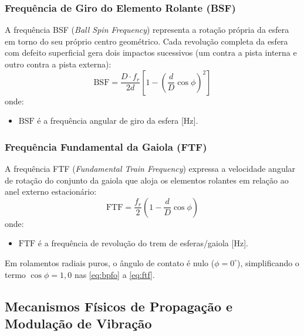 \subsubsection{Frequência de Giro do Elemento Rolante (BSF)}
A frequência BSF (\textit{Ball Spin Frequency}) representa a rotação própria da esfera em torno do seu próprio centro geométrico. Cada revolução completa da esfera com defeito superficial gera dois impactos sucessivos (um contra a pista interna e outro contra a pista externa):
\begin{equation}
    \text{BSF} = \frac{D \cdot f_r}{2d} \left[ 1 - \left(\frac{d}{D}\cos\phi\right)^2 \right]
    \label{eq:bsf}
\end{equation}
onde:
\begin{itemize}
    \item $\text{BSF}$ é a frequência angular de giro da esfera [\si{\hertz}].
\end{itemize}

\subsubsection{Frequência Fundamental da Gaiola (FTF)}
A frequência FTF (\textit{Fundamental Train Frequency}) expressa a velocidade angular de rotação do conjunto da gaiola que aloja os elementos rolantes em relação ao anel externo estacionário:
\begin{equation}
    \text{FTF} = \frac{f_r}{2} \left( 1 - \frac{d}{D}\cos\phi \right)
    \label{eq:ftf}
\end{equation}
onde:
\begin{itemize}
    \item $\text{FTF}$ é a frequência de revolução do trem de esferas/gaiola [\si{\hertz}].
\end{itemize}

Em rolamentos radiais puros, o ângulo de contato é nulo ($\phi = 0^\circ$), simplificando o termo $\cos\phi = 1,0$ nas \autoref{eq:bpfo} a \ref{eq:ftf}.

\subsection{Mecanismos Físicos de Propagação e Modulação de Vibração}
\label{subsec:modulacao_vibracao}

